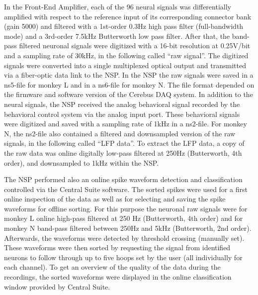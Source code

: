 In the Front-End Amplifier, each of the 96 neural signals was differentially amplified with respect to the reference input of its corresponding connector bank (gain 5000) and filtered with a 1st-order 0.3Hz high pass filter (full-bandwidth mode) and a 3rd-order 7.5kHz Butterworth low pass filter. After that, the band-pass filtered neuronal signals were digitized with a 16-bit resolution at 0.25V/bit and a sampling rate of 30kHz, in the following called “raw signal”. The digitized signals were converted into a single multiplexed optical output and transmitted via a fiber-optic data link to the NSP. In the NSP the raw signals were saved in a ns5-file for monkey L and in a ns6-file for monkey N. The file format depended on the firmware and software version of the Cerebus DAQ system. In addition to the neural signals, the NSP received the analog behavioral signal recorded by the behavioral control system via the analog input port. These behavioral signals were digitized and saved with a sampling rate of 1kHz in a ns2-file. For monkey N, the ns2-file also contained a filtered and downsampled version of the raw signals, in the following called “LFP data”. To extract the LFP data, a copy of the raw data was online digitally low-pass filtered at 250Hz (Butterworth, 4th order), and downsampled to 1kHz within the NSP.

The NSP performed also an online spike waveform detection and classification controlled via the Central Suite software. The sorted spikes were used for a first online inspection of the data as well as for selecting and saving the spike waveforms for offline sorting. For this purpose the neuronal raw signals were for monkey L online high-pass filtered at 250 Hz (Butterworth, 4th order) and for monkey N band-pass filtered between 250Hz and 5kHz (Butterworth, 2nd order). Afterwards, the waveforms were detected by threshold crossing (manually set). These waveforms were then sorted by requesting the signal from identified neurons to follow through up to five hoops set by the user (all individually for each channel). To get an overview of the quality of the data during the recordings, the sorted waveforms were displayed in the online classification window provided by Central Suite.

